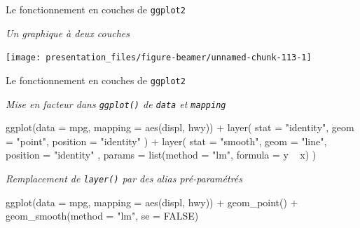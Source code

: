 \documentclass[12pt,ignorenonframetext,handout,]{beamer}
\newenvironment{Shaded}{}{}
\newcommand{\DataTypeTok}[1]{#1}
\newcommand{\KeywordTok}[1]{\textcolor[rgb]{0.00,0.00,1.00}{#1}}
\newcommand{\NormalTok}[1]{#1}
\newcommand{\OperatorTok}[1]{#1}
\newcommand{\OtherTok}[1]{\textcolor[rgb]{1.00,0.25,0.00}{#1}}
\newcommand{\StringTok}[1]{\textcolor[rgb]{0.00,0.50,0.50}{#1}}
\renewenvironment{Shaded}{\begin{snugshade}}{\end{snugshade}}
\begin{document}
\begin{frame}{\large Le fonctionnement en \og couches \fg{} de
\texttt{ggplot2}}
\protect\hypertarget{le-fonctionnement-en-couches-de-ggplot2-3}{}

\emph{Un graphique à deux couches}

\centering

\texttt{[image: presentation\_files/figure-beamer/unnamed-chunk-113-1]}

\end{frame}

\begin{frame}[fragile]{\large Le fonctionnement en \og couches \fg{} de
\texttt{ggplot2}}
\protect\hypertarget{le-fonctionnement-en-couches-de-ggplot2-4}{}

\emph{Mise en facteur dans \texttt{ggplot()} de \texttt{data} et
\texttt{mapping}}

\footnotesize \vspace{-1mm}

\begin{Shaded}
\begin{Highlighting}[]
\KeywordTok{ggplot}\NormalTok{(}\DataTypeTok{data =}\NormalTok{ mpg, }\DataTypeTok{mapping =} \KeywordTok{aes}\NormalTok{(displ, hwy)) }\OperatorTok{+}\StringTok{ }\KeywordTok{layer}\NormalTok{(}
  \DataTypeTok{stat =} \StringTok{"identity"}\NormalTok{, }\DataTypeTok{geom =} \StringTok{"point"}\NormalTok{, }\DataTypeTok{position =} \StringTok{"identity"}
\NormalTok{) }\OperatorTok{+}\StringTok{ }\KeywordTok{layer}\NormalTok{(}
  \DataTypeTok{stat =} \StringTok{"smooth"}\NormalTok{, }\DataTypeTok{geom =} \StringTok{"line"}\NormalTok{, }\DataTypeTok{position =} \StringTok{"identity"}
\NormalTok{  , }\DataTypeTok{params =} \KeywordTok{list}\NormalTok{(}\DataTypeTok{method =} \StringTok{"lm"}\NormalTok{, }\DataTypeTok{formula =}\NormalTok{ y }\OperatorTok{~}\StringTok{ }\NormalTok{x)}
\NormalTok{)}
\end{Highlighting}
\end{Shaded}

\normalsize \vspace{-3mm}

\emph{Remplacement de \texttt{layer()} par des alias pré-paramétrés}

\footnotesize \vspace{-1mm}

\begin{Shaded}
\begin{Highlighting}[]
\KeywordTok{ggplot}\NormalTok{(}\DataTypeTok{data =}\NormalTok{ mpg, }\DataTypeTok{mapping =} \KeywordTok{aes}\NormalTok{(displ, hwy)) }\OperatorTok{+}\StringTok{ }
\StringTok{  }\KeywordTok{geom_point}\NormalTok{() }\OperatorTok{+}\StringTok{ }\KeywordTok{geom_smooth}\NormalTok{(}\DataTypeTok{method =} \StringTok{"lm"}\NormalTok{, }\DataTypeTok{se =} \OtherTok{FALSE}\NormalTok{)}
\end{Highlighting}
\end{Shaded}


\end{frame}
\end{document}
